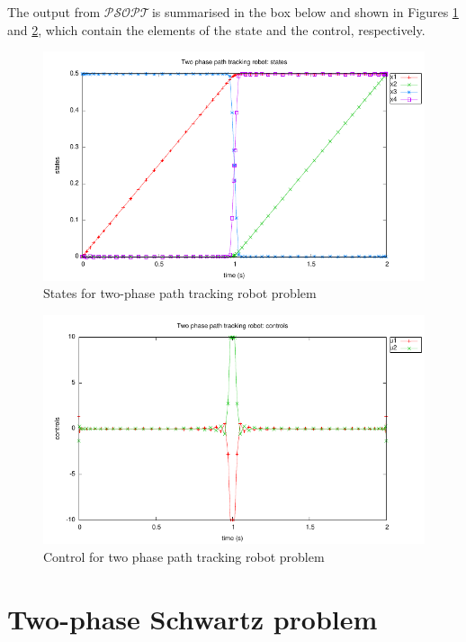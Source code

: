 \documentclass[a4paper,11pt]{report}    %
\newcommand{\psopt}{$\mathcal{PSOPT}$\,}  %
\newenvironment{shadedframe}{%
  \def\FrameCommand{\fcolorbox{black}{shadecolor}}%
  \MakeFramed {\FrameRestore}}
{\endMakeFramed}
\begin{document}
The output from \psopt is summarised in the box below and shown in Figures \ref{fig:tphro_states} and \ref{fig:tphro_control}, which contain the elements
of the state and the control, respectively.

\begin{shadedframe}

\end{shadedframe}

\begin{figure}
  \centering 
  \includegraphics{../examples/twophro/twophro_states}
  \caption{States for two-phase path tracking robot problem}
 \label{fig:tphro_states}
\end{figure}


\begin{figure}
  \centering
  \includegraphics{../examples/twophro/twophro_controls}
  \caption{Control for two phase path tracking robot problem}
 \label{fig:tphro_control}
\end{figure}


\section{Two-phase Schwartz problem}
\end{document}
